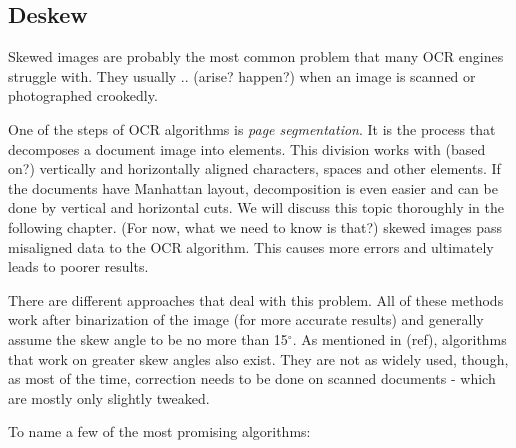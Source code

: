 \subsection{Deskew}

Skewed images are probably the most common problem that many OCR engines struggle with. They usually .. (arise? happen?) when an image is scanned or photographed crookedly. 

One of the steps of OCR algorithms is \emph{page segmentation}. It is the process that decomposes a document image into elements. This division works with (based on?) vertically and horizontally aligned characters, spaces and other elements. If the documents have Manhattan layout, decomposition is even easier and can be done by vertical and horizontal cuts. We will discuss this topic thoroughly in the following chapter. (For now, what we need to know is that?) skewed images pass misaligned data to the OCR algorithm. This causes more errors and ultimately leads to poorer results.

There are different approaches that deal with this problem. All of these methods work after binarization of the image (for more accurate results) and generally assume the skew angle to be no more than 15$^{\circ}$. As mentioned in (ref), algorithms that work on greater skew angles also exist. They are not as widely used, though, as most of the time, correction needs to be done on scanned documents - which are mostly only slightly tweaked.

To name a few of the most promising algorithms:

